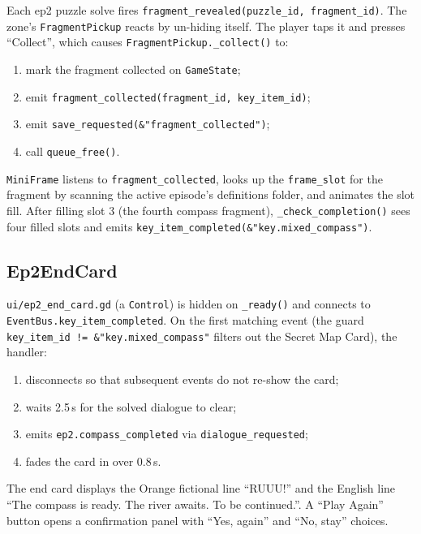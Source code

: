 \documentclass[12pt, a4paper]{article}
\begin{document}
Each ep2 puzzle solve fires \texttt{fragment\_revealed(puzzle\_id, fragment\_id)}.
The zone's \texttt{FragmentPickup} reacts by un-hiding itself. The player
taps it and presses ``Collect'', which causes \texttt{FragmentPickup.\_collect()}
to:

\begin{enumerate}[nosep]
  \item mark the fragment collected on \texttt{GameState};
  \item emit \texttt{fragment\_collected(fragment\_id, key\_item\_id)};
  \item emit \texttt{save\_requested(\&"fragment\_collected")};
  \item call \texttt{queue\_free()}.
\end{enumerate}

\texttt{MiniFrame} listens to \texttt{fragment\_collected}, looks up the
\texttt{frame\_slot} for the fragment by scanning the active episode's
definitions folder, and animates the slot fill. After filling slot 3 (the
fourth compass fragment), \texttt{\_check\_completion()} sees four filled
slots and emits \texttt{key\_item\_completed(\&"key.mixed\_compass")}.

\subsection{Ep2EndCard}

\texttt{ui/ep2\_end\_card.gd} (a \texttt{Control}) is hidden on
\texttt{\_ready()} and connects to \texttt{EventBus.key\_item\_completed}.
On the first matching event (the guard
\texttt{key\_item\_id != \&"key.mixed\_compass"} filters out the Secret Map
Card), the handler:

\begin{enumerate}[nosep]
  \item disconnects so that subsequent events do not re-show the card;
  \item waits 2.5\,s for the solved dialogue to clear;
  \item emits \texttt{ep2.compass\_completed} via \texttt{dialogue\_requested};
  \item fades the card in over 0.8\,s.
\end{enumerate}

The end card displays the Orange fictional line ``RUUU!'' and the English
line ``The compass is ready. The river awaits. To be continued.''.
A ``Play Again'' button opens a confirmation panel with ``Yes, again'' and
``No, stay'' choices.
\end{document}
